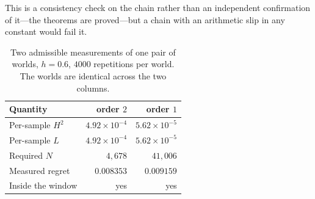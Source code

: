 \documentclass[conference]{IEEEtran}
\theoremstyle{definition}
\begin{document}
This is a consistency check on the chain rather than an independent confirmation of it---the
theorems are proved---but a chain with an arithmetic slip in any constant would fail it.

\begin{table}[htbp]
\caption{Two admissible measurements of one pair of worlds, $h=0.6$, $4000$ repetitions per
world. The worlds are identical across the two columns.}
\label{tab:qy-query}
\centering
\footnotesize
\begin{tabular}{@{}lrr@{}}
\toprule
Quantity & order $2$ & order $1$ \\
\midrule
Per-sample $H^{2}$      & $4.92\times10^{-4}$ & $5.62\times10^{-5}$ \\
Per-sample $L$          & $4.92\times10^{-4}$ & $5.62\times10^{-5}$ \\
Required $N$            & $4{,}678$           & $41{,}006$ \\
Measured regret         & $0.008353$          & $0.009159$ \\
Inside the window       & yes                 & yes \\
\bottomrule
\end{tabular}
\end{table}
\end{document}
